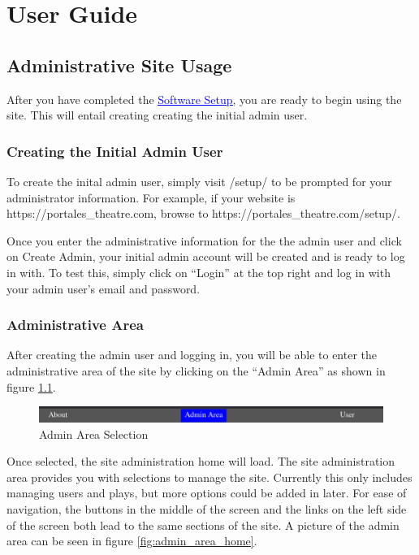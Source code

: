 \part{User Guide}
\chapter{Administrative Site Usage}

After you have completed the \hyperref[software_setup]{\textcolor{blue}{\underline{Software Setup}}}, you are ready to begin using the site. This will entail creating creating the initial admin user.

\section{Creating the Initial Admin User}

To create the inital admin user, simply visit /setup/ to be prompted for your administrator information. For example, if your website is https://portales\_theatre.com, browse to https://portales\_theatre.com/setup/.

Once you enter the administrative information for the the admin user and click on Create Admin, your initial admin account will be created and is ready to log in with. To test this, simply click on ``Login'' at the top right and log in with your admin user's email and password.

\section{Administrative Area}

After creating the admin user and logging in, you will be able to enter the administrative area of the site by clicking on the ``Admin Area'' as shown in figure \ref{fig:admin_area_link}.

\begin{figure}[ht]
    \includegraphics[width=16cm]{images/chapter2/admin area link}
    \caption{Admin Area Selection}
    \label{fig:admin_area_link}
\end{figure}

Once selected, the site administration home will load. The site administration area provides you with selections to manage the site. Currently this only includes managing users and plays, but more options could be added in later. For ease of navigation, the buttons in the middle of the screen and the links on the left side of the screen both lead to the same sections of the site. A picture of the admin area can be seen in figure \ref{fig:admin_area_home}.

